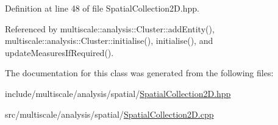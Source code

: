 Definition at line 48 of file Spatial\-Collection2\-D.\-hpp.



Referenced by multiscale\-::analysis\-::\-Cluster\-::add\-Entity(), multiscale\-::analysis\-::\-Cluster\-::initialise(), initialise(), and update\-Measures\-If\-Required().



The documentation for this class was generated from the following files\-:\begin{DoxyCompactItemize}
\item 
include/multiscale/analysis/spatial/\hyperlink{SpatialCollection2D_8hpp}{Spatial\-Collection2\-D.\-hpp}\item 
src/multiscale/analysis/spatial/\hyperlink{SpatialCollection2D_8cpp}{Spatial\-Collection2\-D.\-cpp}\end{DoxyCompactItemize}
